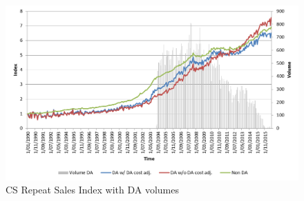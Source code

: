 
\begin{figure}[!ht]
    \centering
    \includegraphics[width=\textwidth]{Figures/cs_rs_index.png}
    \caption{CS Repeat Sales Index with DA volumes}
    \label{fig:BMN}
\end{figure}